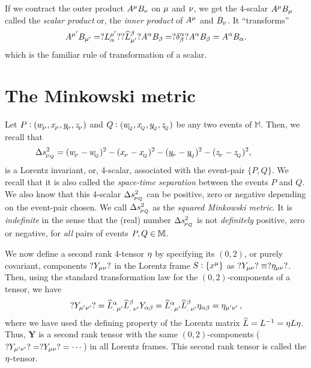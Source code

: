  If we contract the outer product 
$A^{{\mu}} B_{{\nu}} $ on ${\mu}$ 
and ${\nu}$, we get the 4-scalar $A^{{\mu}} B_{{\mu}}$ called 
the \textit{scalar product} or, the \textit{inner 
product} of $A^{{\mu}}$ and $B_{{\nu}}$. It 
``transforms''  
\begin{align*}
A^{{\mu'}} B_{{\mu'}} =?L^{{\mu'}}_{{\alpha}}?
?{{\widehat{L}}}^{{\beta}}_{{\mu'}}?
A^{{\alpha}} B_{{\beta}} = ?\delta^{{\alpha}}_{{\beta}}? A^{{\alpha}} B_{{\beta}}= 
A^{{\alpha}} B_{{\alpha}}.
\end{align*}
which is the familiar rule of transformation of a 
scalar.
\section{The Minkowski metric}
Let $P:(w_{_{\hspace*{-1.5pt}{P}}},x_{_{\hspace*{-1.5pt}{P}}},y_{_{\hspace*{-1.5pt}{P}}},z_{_{\hspace*{-1.5pt}{P}}})$ and 
$Q:(w_{_{\hspace*{-1.5pt}{Q}}},x_{_{\hspace*{-1.5pt}{Q}}},y_{_{\hspace*{-1.5pt}{Q}}},z_{_{\hspace*{-1.5pt}{Q}}})$ be any 
two events of $\mathbb{M}$. Then, we recall that
\begin{align}\label{mw.16}
\nnnt\nnnt \nnnt\nnnt \Delta s_\sfx{PQ}^2&= 
(w_\sfx{P}-w_\sfx{Q})^2 -(x_\sfx{P}-x_\sfx{Q})^2 - 
(y_\sfx{P}-y_\sfx{Q})^2 -(z_\sfx{P}-z_\sfx{Q})^2,
\end{align}
is a Lorentz invariant, or, 4-scalar, associated with 
the event-pair  $\{P,Q\}$. We recall that it is also 
called the \textit{space-time separation}  between the 
events $P$ and $Q$. We also know that this 4-scalar 
$\Delta s_{_{\hspace*{-1.5pt}{PQ}}}^2$ can be positive, zero or negative 
depending on the event-pair chosen. 
We call $\Delta s_{_{\hspace*{-1.5pt}{PQ}}}^2$ as the 
\textit{squared Minkowski metric}.   It is  \textit{indefinite} in 
the sense that the (real) number $\Delta s_{_{\hspace*{-1.5pt}{PQ}}}^2$ 
is not \textsl{definitely} positive, zero or negative, 
for \textsl{all} pairs of events $P,Q\in\mathbb{M}$.

  We now define 
a second rank 4-tensor {\large\bf ${\eta}$} by
specifying its 
$(0,2)$, or purely covariant, components $?Y_{{\mu}{\nu}}?$ in 
the Lorentz frame $S:\{x^{{\mu}}\}$ as $?Y_{{\mu}{\nu}}?\equiv  
?{\eta}_{{\mu}{\nu}}?$. Then, using the standard  
transformation law for the $(0,2)$-components of a 
tensor, we  have
\begin{align}\label{mw.17}
?Y_{{\mu'}{\nu'}}?
={{{\widehat{L}}}^{{\alpha}}_{.\;{\mu'}}}{{{\widehat{L}}}^{{\beta}}_{.\;{\nu'}}}Y_{{\alpha}{\beta}}
={{{\widehat{L}}}^{{\alpha}}_{.\;{\mu'}}}
{{{\widehat{L}}}^{{\beta}}_{.\;{\nu'}}}{\eta}_{{\alpha}{\beta}}
={\eta}_{{\mu'}{\nu'}}\,,
\end{align} where we have used the defining property of 
the Lorentz matrix ${\widehat{L}}=L^{-1}={\eta} L{\eta}$. Thus,  
$\mathbf{Y}$ is a second rank tensor with the\boxed{} 
same      $(0,2)$-components (\ie $?Y_{{\mu'}{\nu'}}? = 
?Y_{{\mu}{\nu}}? =\cdots$) in all Lorentz frames. This 
second rank tensor is called the ${\eta}$-tensor. 


